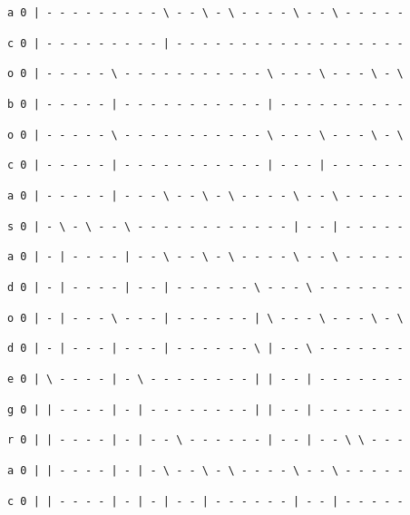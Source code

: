 \documentclass[11pt,a4paper]{article} %
\begin{document}
\texttt{a 0 | - - - - - - - - - \textbackslash{ }- - \textbackslash{ }- \textbackslash{ }- - - - \textbackslash{ }- - \textbackslash{ }- - - - -}

\texttt{c 0 | - - - - - - - - - | - - - - - - - - - - - - - - - - - -}

\texttt{o 0 | - - - - - \textbackslash{ }- - - - - - - - - - - \textbackslash{ }- - - \textbackslash{ }- - - \textbackslash{ }- \textbackslash}

\texttt{b 0 | - - - - - | - - - - - - - - - - - | - - - - - - - - - -}

\texttt{o 0 | - - - - - \textbackslash{ }- - - - - - - - - - - \textbackslash{ }- - - \textbackslash{ }- - - \textbackslash{ }- \textbackslash}

\texttt{c 0 | - - - - - | - - - - - - - - - - - | - - - | - - - - - -}

\texttt{a 0 | - - - - - | - - - \textbackslash{ }- - \textbackslash{ }- \textbackslash{ }- - - - \textbackslash{ }- - \textbackslash{ }- - - - -}

\texttt{s 0 | - \textbackslash{ }- \textbackslash{ }- - \textbackslash{ }- - - - - - - - - - - - | - - | - - - - -}

\texttt{a 0 | - | - - - - | - - \textbackslash{ }- - \textbackslash{ }- \textbackslash{ }- - - - \textbackslash{ }- - \textbackslash{ }- - - - -}

\texttt{d 0 | - | - - - - | - - | - - - - - - \textbackslash{ }- - - \textbackslash{ }- - - - - - -}

\texttt{o 0 | - | - - - \textbackslash{ }- - - | - - - - - - | \textbackslash{ }- - - \textbackslash{ }- - - \textbackslash{ }- \textbackslash}

\texttt{d 0 | - | - - - | - - - | - - - - - - \textbackslash{ }| - - \textbackslash{ }- - - - - - -}

\texttt{e 0 | \textbackslash{ }- - - - | - \textbackslash{ }- - - - - - - - | | - - | - - - - - - -}

\texttt{g 0 | | - - - - | - | - - - - - - - - | | - - | - - - - - - -}

\texttt{r 0 | | - - - - | - | - - \textbackslash{ }- - - - - - | - - | - - \textbackslash{ }\textbackslash{ }- - -}

\texttt{a 0 | | - - - - | - | - \textbackslash{ }- - \textbackslash{ }- \textbackslash{ }- - - - \textbackslash{ }- - \textbackslash{ }- - - - -}

\texttt{c 0 | | - - - - | - | - | - - | - - - - - - | - - | - - - - -}
\end{document}

